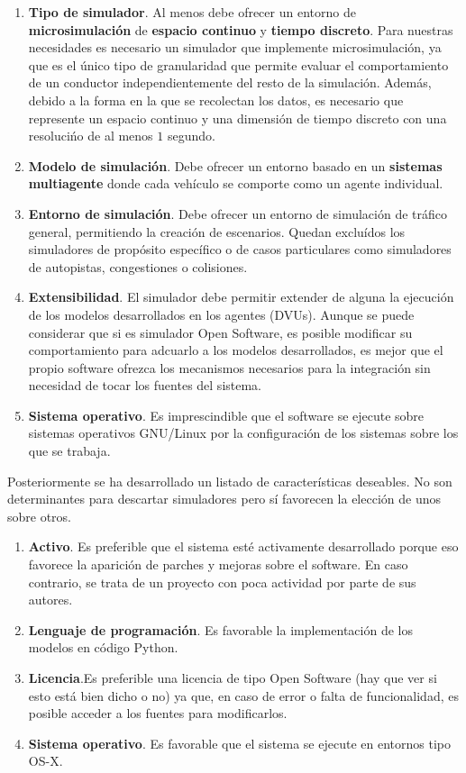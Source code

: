 {\begin{enumerate}
	\item \textbf{Tipo de simulador}. Al menos debe ofrecer un entorno de \textbf{microsimulación} de \textbf{espacio continuo} y \textbf{tiempo discreto}. Para nuestras necesidades es necesario un simulador que implemente microsimulación, ya que es el único tipo de granularidad que permite evaluar el comportamiento de un conductor independientemente del resto de la simulación. Además, debido a la forma en la que se recolectan los datos, es necesario que represente un espacio continuo y una dimensión de tiempo discreto con una resolucińo de al menos $1$ segundo.
	\item \textbf{Modelo de simulación}. Debe ofrecer un entorno basado en un \textbf{sistemas multiagente} donde cada vehículo se comporte como un agente individual.
	\item \textbf{Entorno de simulación}. Debe ofrecer un entorno de simulación de tráfico general, permitiendo la creación de escenarios. Quedan excluídos los simuladores de propósito específico o de casos particulares como simuladores de autopistas, congestiones o colisiones.
	\item \textbf{Extensibilidad}. El simulador debe permitir extender de alguna la ejecución de los modelos desarrollados en los agentes (DVUs). Aunque se puede considerar que si es simulador Open Software, es posible modificar su comportamiento para adcuarlo a los modelos desarrollados, es mejor que el propio software ofrezca los mecanismos necesarios para la integración sin necesidad de tocar los fuentes del sistema.
	\item \textbf{Sistema operativo}. Es imprescindible que el software se ejecute sobre sistemas operativos GNU/Linux por la configuración de los sistemas sobre los que se trabaja.
\end{enumerate}

Posteriormente se ha desarrollado un listado de características deseables. No son determinantes para descartar simuladores pero sí favorecen la elección de unos sobre otros.

\begin{enumerate}
	\item \textbf{Activo}. Es preferible que el sistema esté activamente desarrollado porque eso favorece la aparición de parches y mejoras sobre el software. En caso contrario, se trata de un proyecto con poca actividad por parte de sus autores.
	\item \textbf{Lenguaje de programación}. Es favorable la implementación de los modelos en código Python.
	\item \textbf{Licencia}.Es preferible una licencia de tipo Open Software (\TODO hay que ver si esto está bien dicho o no) ya que, en caso de error o falta de funcionalidad, es posible acceder a los fuentes para modificarlos.
	\item \textbf{Sistema operativo}. Es favorable que el sistema se ejecute en entornos tipo OS-X.
\end{enumerate}

}
